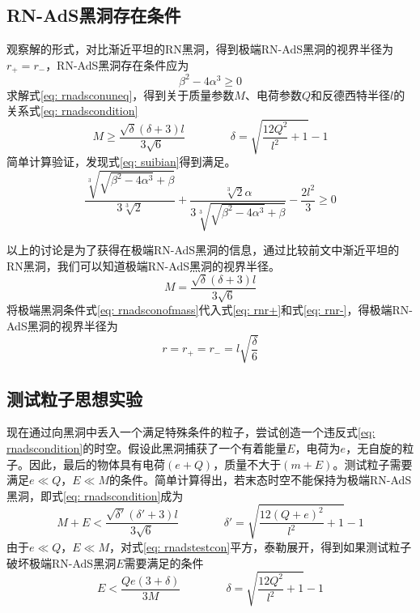 \subsection{RN-AdS黑洞存在条件}
观察解的形式，对比渐近平坦的RN黑洞，得到极端RN-AdS黑洞的视界半径为$r_+=r_-$，RN-AdS黑洞存在条件应为
\begin{equation}\label{eq: rnadsconuneq}
    \beta^2-4\alpha^3 \geq 0
\end{equation}
求解式\eqref{eq: rnadsconuneq}，得到关于质量参数$M$、电荷参数$Q$和反德西特半径$l$的关系式\eqref{eq: rnadscondition}
\begin{equation}\label{eq: rnadscondition}
    M \geq \frac{\sqrt{\delta } (\delta +3) l}{3 \sqrt{6}} \qquad\qquad  \delta= \sqrt{\frac{12 Q^2}{l^2}+1}-1 
\end{equation}
简单计算验证，发现式\eqref{eq: suibian}得到满足。
\begin{equation}\label{eq: suibian}
    \frac{\sqrt[3]{\sqrt{\beta^2-4 \alpha^3}+\beta}}{3\sqrt[3]{2}}+\frac{\sqrt[3]{2} \alpha}{3 \sqrt[3]{\sqrt{\beta^2-4\alpha^3}+\beta}}-\frac{2 l^2}{3} \geq 0
\end{equation}

以上的讨论是为了获得在极端RN-AdS黑洞的信息，通过比较前文中渐近平坦的RN黑洞，我们可以知道极端RN-AdS黑洞的视界半径。
\begin{equation}\label{eq: rnadsconofmass}
    M=\frac{\sqrt{\delta } (\delta +3) l}{3 \sqrt{6}}
\end{equation}
将极端黑洞条件式\eqref{eq: rnadsconofmass}代入式\eqref{eq: rnr+}和式\eqref{eq: rnr-}，得极端RN-AdS黑洞的视界半径为
\begin{equation}\label{eq: rnadshorizonex}
    r=r_+=r_-=l\sqrt{\frac{\delta}{6}} 
\end{equation}
\subsection{测试粒子思想实验}
现在通过向黑洞中丢入一个满足特殊条件的粒子，尝试创造一个违反式\eqref{eq: rnadscondition}的时空。假设此黑洞捕获了一个有着能量$E$，电荷为$e$，无自旋的粒子。因此，最后的物体具有电荷$\left(e+Q\right)$，质量不大于$\left(m+E\right)$。测试粒子需要满足$e\ll Q$，$E\ll M$的条件。简单计算得出，若末态时空不能保持为极端RN-AdS黑洞，即式\eqref{eq: rnadscondition}成为
\begin{equation}\label{eq: rnadstestcon}
    M+E < \frac{\sqrt{\delta' } (\delta' +3) l}{3 \sqrt{6}} \quad\quad\quad\quad  \delta'= \sqrt{\frac{12 \left(Q+e\right)^2}{l^2}+1}-1
\end{equation}
由于$e\ll Q$，$E\ll M$，对式\eqref{eq: rnadstestcon}平方，泰勒展开，得到如果测试粒子破坏极端RN-AdS黑洞$E$需要满足的条件
\begin{equation}\label{eq: rnadsdiscon}
    E < \frac{Q e \left(3+\delta\right)}{3M} \qquad\qquad  \delta= \sqrt{\frac{12 Q^2}{l^2}+1}-1
\end{equation}

